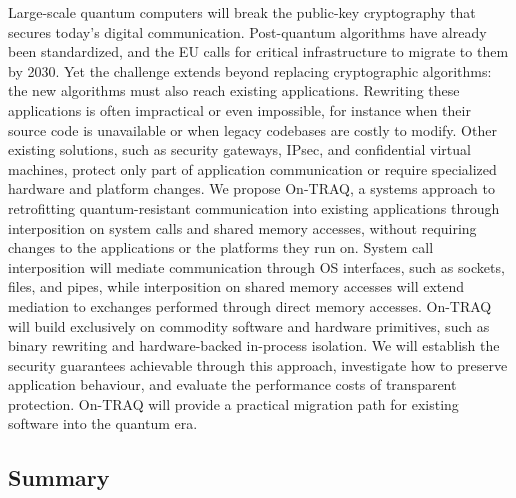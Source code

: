 \documentclass[a4paper,10pt,fleqn]{application}
\begin{document}
Large-scale quantum computers will break the public-key cryptography that secures today's digital communication. Post-quantum algorithms have already been standardized, and the EU calls for critical infrastructure to migrate to them by 2030. Yet the challenge extends beyond replacing cryptographic algorithms: the new algorithms must also reach existing applications. Rewriting these applications is often impractical or even impossible, for instance when their source code is unavailable or when legacy codebases are costly to modify. Other existing solutions, such as security gateways, IPsec, and confidential virtual machines, protect only part of application communication or require specialized hardware and platform changes. We propose On-TRAQ, a systems approach to retrofitting quantum-resistant communication into existing applications through interposition on system calls and shared memory accesses, without requiring changes to the applications or the platforms they run on. System call interposition will mediate communication through OS interfaces, such as sockets, files, and pipes, while interposition on shared memory accesses will extend mediation to exchanges performed through direct memory accesses. On-TRAQ will build exclusively on commodity software and hardware primitives, such as binary rewriting and hardware-backed in-process isolation. We will establish the security guarantees achievable through this approach, investigate how to preserve application behaviour, and evaluate the performance costs of transparent protection. On-TRAQ will provide a practical migration path for existing software into the quantum era.

\subsection{Summary}
\end{document}
